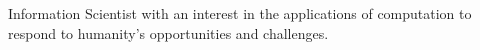 

\begin{cvparagraph}

Information Scientist with an interest in the applications of computation to respond to humanity's opportunities and challenges.
\end{cvparagraph}

